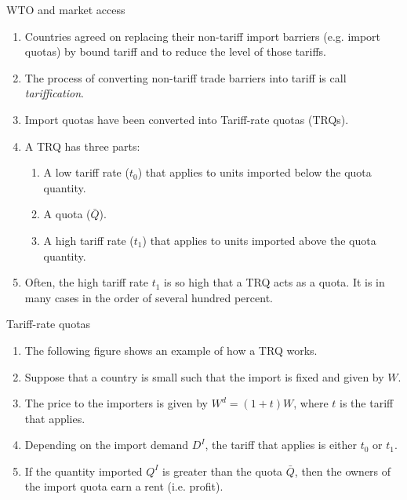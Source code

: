 \documentclass[table,xcolor=pdftex,dvipsnames]{beamer}\usepackage[]{graphicx}\usepackage[]{color}
\begin{document}
\begin{frame}{WTO and market access}
\begin{enumerate}[label=\textbullet]
    \item Countries agreed on replacing their non-tariff import barriers (e.g. import quotas) by bound tariff and to reduce the level of those tariffs.
    \item The process of converting non-tariff trade barriers into tariff is call \emph{tariffication}.
    \item Import quotas have been converted into Tariff-rate quotas (TRQs).
    \item A TRQ has three parts:
      \begin{enumerate}[label=\Roman*)]
        \item A low tariff rate ($t_0$) that applies to units imported below the quota quantity.
        \item A quota ($\bar{Q}$).
        \item A high tariff rate ($t_1$) that applies to units imported above the quota quantity.
      \end{enumerate}
    \item Often, the high tariff rate $t_1$ is so high that a TRQ acts as a quota. It is in many cases in the order of several hundred percent.
\end{enumerate}
\end{frame}


\begin{frame}{Tariff-rate quotas}
\begin{enumerate}[label=\textbullet]
    \item The following figure shows an example of how a TRQ works.
    \item Suppose that a country is small such that the import is fixed and given by $W$.
    \item The price to the importers is given by $W^d = (1+t)W$, where $t$ is the tariff that applies.
    \item Depending on the import demand $D^I$, the tariff that applies is either $t_0$ or $t_1$.
    \item If the quantity imported $Q^I$ is greater than the quota $\bar{Q}$, then the owners of the import quota earn a rent (i.e. profit).
\end{enumerate}
\end{frame}
\end{document}
